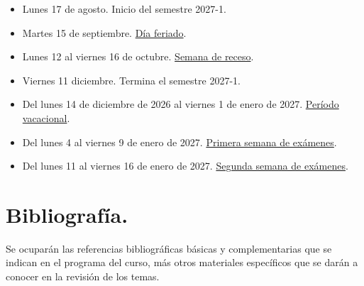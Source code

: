 \documentclass[12pt]{article}
\numberwithin{equation}{section}
\begin{document}
\begin{itemize}
\item Lunes 17 de agosto. Inicio del semestre 2027-1.
\item Martes 15 de septiembre. \underline{Día feriado}.
\item Lunes 12 al viernes 16 de octubre. \underline{Semana de receso}.
\item Viernes 11 diciembre. Termina el semestre 2027-1.
\item Del lunes 14 de diciembre de 2026 al viernes 1 de enero de 2027. \underline{Período vacacional}.
\item Del lunes 4 al viernes 9 de enero de 2027. \underline{Primera semana de exámenes}.
\item Del lunes 11 al viernes 16 de enero de 2027. \underline{Segunda semana de exámenes}.
\end{itemize}

\newpage

\section{Bibliografía.}

Se ocuparán las referencias bibliográficas básicas y complementarias que se indican en el programa del curso, más otros materiales específicos que se darán a conocer en la revisión de los temas.

\nocite{*}
\printbibliography[title=Referencias para el curso.]
\end{document}
